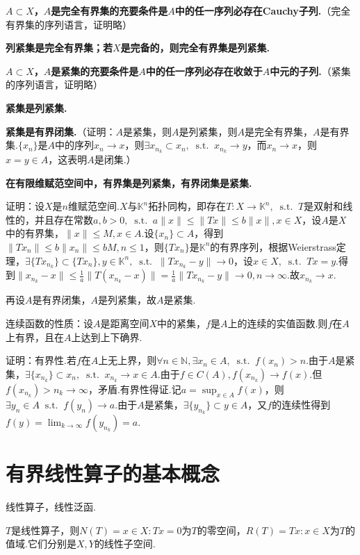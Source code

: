 \documentclass[bwprint, withoutpreface]{cumcmthesis}
\newcommand*{\st}{\mathop{}\!\mathrm{s.t.}\!\mathop{}}
\newcommand*{\norm}[1]{\| #1 \|}
\begin{document}
\textbf{$A \subset X$，$A$是完全有界集的充要条件是$A$中的任一序列必存在Cauchy子列.}（完全有界集的序列语言，证明略）

\textbf{列紧集是完全有界集；若$X$是完备的，则完全有界集是列紧集.}

\textbf{$A \subset X$，$A$是紧集的充要条件是$A$中的任一序列必存在收敛于$A$中元的子列.}（紧集的序列语言，证明略）

\textbf{紧集是列紧集.}

\textbf{紧集是有界闭集.}（证明：$A$是紧集，则$A$是列紧集，则$A$是完全有界集，$A$是有界集.$\{x_n\}$是$A$中的序列$x_n \to x$，则$\exists {x_{n_k}} \subset {x_n}, \st x_{n_k} \to y$，而$x_n \to x$，则$x = y \in A$，这表明$A$是闭集.）

\textbf{在有限维赋范空间中，有界集是列紧集，有界闭集是紧集.}

证明：设$X$是$n$维赋范空间.$X$与$\mathbb{K}^n$拓扑同构，即存在$T:X \to \mathbb{K}^n, \st T$是双射和线性的，并且存在常数$a, b > 0, \st a \norm{x} \leqslant \norm{Tx} \leqslant b \norm{x}, x \in X$，设$A$是$X$中的有界集，$\norm{x} \leqslant M, x \in A$.设$\{x_n\} \subset A$，得到$\norm{Tx_n} \leqslant b \norm{x_n} \leqslant bM, n \leqslant 1$，则$\{Tx_n\}$是$\mathbb{K}^n$的有界序列，根据Weierstrass定理，$\exists \{Tx_{n_k}\} \subset \{Tx_n\}, y \in \mathbb{K}^n, \st \norm{Tx_{n_k} - y} \to 0$，设$x \in X, \st Tx = y.$得到$\norm{x_{n_k} - x} \leqslant \frac{1}{a} \norm{T(x_{n_k}- x)} = \frac{1}{a} \norm{Tx_{n_k} - y} \to 0, n \to \infty.$故$x_{n_k} \to x.$

再设$A$是有界闭集，$A$是列紧集，故$A$是紧集.

连续函数的性质：设$A$是距离空间$X$中的紧集，$f$是$A$上的连续的实值函数.则$f$在$A$上有界，且在$A$上达到上下确界.

证明：有界性.若$f$在$A$上无上界，则$\forall n \in \mathbb{N}, \exists x_n \in A, \st f(x_n) > n$.由于$A$是紧集，$\exists \{x_{n_k}\} \subset {x_n}, \st x_{n_k} \to x \in A.$由于$f \in C(A), f(x_{n_k}) \to f(x).$但$f(x_{n_k}) > n_k \to \infty$，矛盾.有界性得证.记$a = \sup_{x \in A}{f(x)}$，则$\exists y_n \in A \st f(y_n) \to a$.由于$A$是紧集，$\exists \{y_{n_k}\} \subset y \in A$，又$f$的连续性得到$f(y) = \lim_{k \to \infty}{f(y_{n_k})} = a$.

\section{有界线性算子的基本概念}
线性算子，线性泛函.

$T$是线性算子，则$N(T) = {x \in X: Tx = 0}$为$T$的零空间，$R(T) = {Tx: x \in X}$为$T$的值域.它们分别是$X, Y$的线性子空间.
\end{document}
